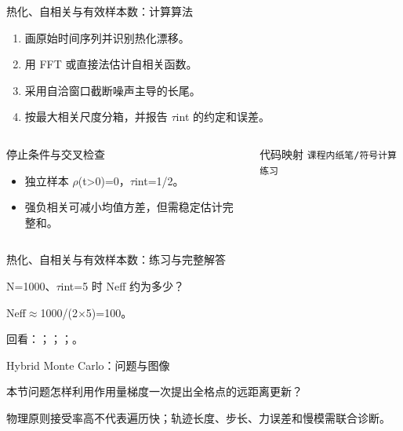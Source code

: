 \begin{frame}[t]{热化、自相关与有效样本数：计算算法}
\footnotesize
{}\begin{enumerate}
\item 画原始时间序列并识别热化漂移。
\item 用 FFT 或直接法估计自相关函数。
\item 采用自洽窗口截断噪声主导的长尾。
\item 按最大相关尺度分箱，并报告 \ensuremath{\tau}int 的约定和误差。
\end{enumerate}\begin{columns}[T,onlytextwidth]
\begin{block}{停止条件与交叉检查}\scriptsize\begin{itemize}
\item[\CheckMark] 独立样本 \ensuremath{\rho}(t>0)=0，\ensuremath{\tau}int=1/\allowbreak{}2。
\item[\CheckMark] 强负相关可减小均值方差，但需稳定估计完整和。
\end{itemize}\end{block}
\begin{block}{代码映射}
\scriptsize \texttt{课程内纸笔/\allowbreak{}符号计算练习}
\end{block}\end{columns}\end{frame}

\begin{frame}[t]{热化、自相关与有效样本数：练习与完整解答}
\footnotesize
\begin{block}{}N=1000、\ensuremath{\tau}int=5 时 Neff 约为多少？\end{block}
\begin{exampleblock}{}Neff\ensuremath{\approx}1000/\allowbreak{}(2\ensuremath{\times}5)=100。\end{exampleblock}
\vfill
\scriptsize 回看：；；；。
\end{frame}

\begin{frame}[t]{Hybrid Monte Carlo：问题与图像}
\footnotesize
\begin{block}{本节问题}怎样利用作用量梯度一次提出全格点的远距离更新？\end{block}
\begin{block}{物理原则}\quad 接受率高不代表遍历快；轨迹长度、步长、力误差和慢模需联合诊断。\end{block}
\end{frame}

